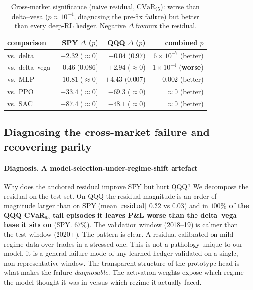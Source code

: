 \documentclass[sigconf,anonymous]{acmart}
\begin{document}
\begin{table}[t]
\centering
\caption{Cross-market significance (naive residual, $\mathrm{CVaR}_{95}$):
worse than delta--vega ($p\!\approx\!10^{-4}$, diagnosing the pre-fix failure)
but better than every deep-RL hedger. Negative $\Delta$ favours the residual.}
\label{tab:crosssig}
\small
\begin{tabular}{lrrr}
\toprule
comparison & SPY $\Delta$ ($p$) & QQQ $\Delta$ ($p$) & combined $p$ \\
\midrule
vs.\ delta       & $-2.32$ ($\approx0$) & $+0.04$ ($0.97$) & $5\!\times\!10^{-7}$ (better) \\
vs.\ delta--vega & $-0.46$ ($0.086$)    & $+2.94$ ($\approx0$) & $1\!\times\!10^{-4}$ (\textbf{worse}) \\
vs.\ MLP         & $-10.81$ ($\approx0$) & $+4.43$ ($0.007$) & $0.002$ (better) \\
vs.\ PPO         & $-33.4$ ($\approx0$)  & $-69.3$ ($\approx0$) & $\approx0$ (better) \\
vs.\ SAC         & $-87.4$ ($\approx0$)  & $-48.1$ ($\approx0$) & $\approx0$ (better) \\
\bottomrule
\end{tabular}
\end{table}

\subsection{Diagnosing the cross-market failure and recovering parity}
\label{sec:fix}

\paragraph{Diagnosis. A model-selection-under-regime-shift artefact}
Why does the anchored residual improve SPY but hurt QQQ? We decompose the residual
on the test set. On QQQ the residual magnitude is an order of magnitude larger than
on SPY (mean $|{\rm residual}|$ $0.22$ vs $0.03$) and in
\textbf{$100\%$ of the QQQ CVaR$_{95}$ tail episodes it leaves P\&L worse than the
delta--vega base it sits on} (SPY. $67\%$). The validation window (2018--19) is
calmer than the test window (2020+). The pattern is clear. A residual calibrated
on mild-regime data over-trades in a stressed one. This is not a pathology unique
to our model, it is a general failure mode of any learned hedger validated on a
single, non-representative window. The transparent structure of the prototype head
is what makes the failure \emph{diagnosable}. The activation weights expose which
regime the model thought it was in versus which regime it actually faced.
\end{document}
